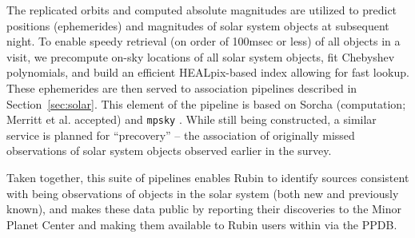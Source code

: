The replicated orbits and computed absolute magnitudes are utilized to
predict positions (ephemerides) and magnitudes of solar system objects at
subsequent night.  To enable speedy retrieval (on order of 100msec or less)
of all objects in a visit, we precompute on-sky locations of all solar
system objects, fit Chebyshev polynomials, and build an efficient
HEALpix-based index allowing for fast lookup.  These ephemerides are then
served to association pipelines described in Section~\ref{sec:solar}.  This
element of the pipeline is based on Sorcha (computation; Merritt et al. 
accepted) and {\tt mpsky} \citep[fast lookup and serving;][]{mpsky}.  While
still being constructed, a similar service is planned for ``precovery'' --
the association of originally missed observations of solar system objects
observed earlier in the survey.

Taken together, this suite of pipelines enables Rubin to identify sources
consistent with being observations of objects in the solar system (both new
and previously known), and makes these data public by reporting their
discoveries to the Minor Planet Center and making them available to Rubin
users within via the PPDB.
